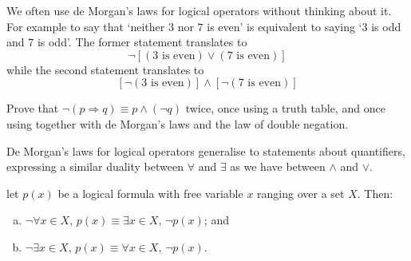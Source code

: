 \begin{example}
We often use de Morgan's laws for logical operators without thinking about it. For example to say that `neither $3$ nor $7$ is even' is equivalent to saying `$3$ is odd and $7$ is odd'. The former statement translates to
\[ \neg [(3 \text{ is even}) \vee (7 \text{ is even})]\]
while the second statement translates to
\[ [\neg (3 \text{ is even})] \wedge [\neg (7 \text{ is even})]\]
\end{example}

\begin{exercise}
\label{exNegationOfImplication}
Prove that $\neg (p \Rightarrow q) \equiv p \wedge (\neg q)$ twice, once using a truth table, and once using  together with de Morgan's laws and the law of double negation.
\end{exercise}

De Morgan's laws for logical operators generalise to statements about quantifiers, expressing a similar duality between $\forall$ and $\exists$ as we have between $\wedge$ and $\vee$.

\begin{theorem}
\label{thmDeMorganQuantifiers}
let $p(x)$ be a logical formula with free variable $x$ ranging over a set $X$. Then:
\begin{enumerate}[(a)]
\item $\neg \forall x \in X,\, p(x) \equiv \exists x \in X,\, \neg p(x)$; and
\item $\neg \exists x \in X,\, p(x) \equiv \forall x \in X,\, \neg p(x)$.
\end{enumerate}
\end{theorem}

